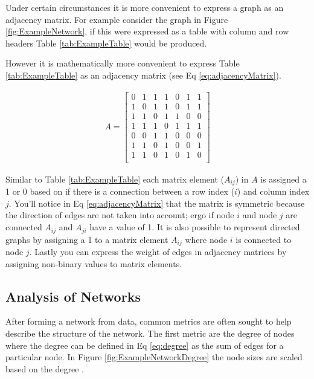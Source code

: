 Under certain circumstances it is more convenient to express a graph as an adjacency matrix.  For example consider the graph in Figure \ref{fig:ExampleNetwork}, if this were expressed as a table with column and row headers Table \ref{tab:ExampleTable} would be produced. 

However it is mathematically more convenient to express Table \ref{tab:ExampleTable} as an adjacency matrix (see Eq \ref{eq:adjacencyMatrix}).

\begin{gather}
A =
 \begin{bmatrix}
    0 & 1 & 1 & 1 & 0 & 1 & 1 \\
    1 & 0 & 1 & 1 & 0 & 1 & 1 \\
    1 & 1 & 0 & 1 & 1 & 0 & 0 \\
    1 & 1 & 1 & 0 & 1 & 1 & 1 \\
    0 & 0 & 1 & 1 & 0 & 0 & 0 \\ 
    1 & 1 & 0 & 1 & 0 & 0 & 1 \\
    1 & 1 & 0 & 1 & 0 & 1 & 0 \\
  \end{bmatrix}
  \label{eq:adjacencyMatrix}
\end{gather}

\noindent Similar to Table \ref{tab:ExampleTable} each matrix element (\(A_{ij}\)) in \(A\) is assigned a 1 or 0 based on if there is a connection between a row index (\(i\))  and column index \(j\). You'll notice in Eq \ref{eq:adjacencyMatrix} that the matrix is symmetric because 
the direction of edges are not taken into account; ergo if node \(i\) and node \(j\) are connected \(A_{ij}\) and \(A_{ji}\) have a value of 1. It is also possible to represent directed graphs by assigning a 1 to a matrix element \(A_{ij}\) where node \(i\) is connected to node \(j\). Lastly you can express the weight of edges in adjacency matrices by assigning non-binary values to matrix elements.

\subsection{Analysis of Networks}
After forming a network from data, common metrics are often sought to help describe the structure of the network.  The first metric are the degree of nodes where the degree  can be defined in Eq \ref{eq:degree} as the sum of edges for a particular node. In Figure \ref{fig:ExampleNetworkDegree} the node sizes are scaled based on the degree .


